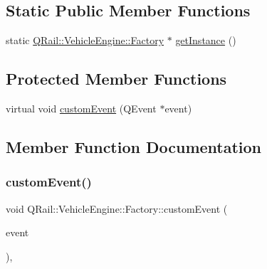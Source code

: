 \subsection*{Static Public Member Functions}
\begin{DoxyCompactItemize}
\item 
static \mbox{\hyperlink{classQRail_1_1VehicleEngine_1_1Factory}{Q\+Rail\+::\+Vehicle\+Engine\+::\+Factory}} $\ast$ \mbox{\hyperlink{classQRail_1_1VehicleEngine_1_1Factory_a24cf481e93425f2285db3e0a7ce16656}{get\+Instance}} ()
\end{DoxyCompactItemize}
\subsection*{Protected Member Functions}
\begin{DoxyCompactItemize}
\item 
virtual void \mbox{\hyperlink{classQRail_1_1VehicleEngine_1_1Factory_a0ee4d43fba0cfaa5174215af68eb3ad0}{custom\+Event}} (Q\+Event $\ast$event)
\end{DoxyCompactItemize}


\subsection{Member Function Documentation}
\mbox{\label{classQRail_1_1VehicleEngine_1_1Factory_a0ee4d43fba0cfaa5174215af68eb3ad0}} 
\subsubsection{\texorpdfstring{customEvent()}{customEvent()}}
{\footnotesize\ttfamily void Q\+Rail\+::\+Vehicle\+Engine\+::\+Factory\+::custom\+Event (\begin{DoxyParamCaption}\item[{Q\+Event $\ast$}]{event }\end{DoxyParamCaption})\hspace{0.3cm}{\ttfamily [protected]}, {\ttfamily [virtual]}}

\mbox{\label{classQRail_1_1VehicleEngine_1_1Factory_af52581bd7bba4a6da7905a4fed843f29}} 
